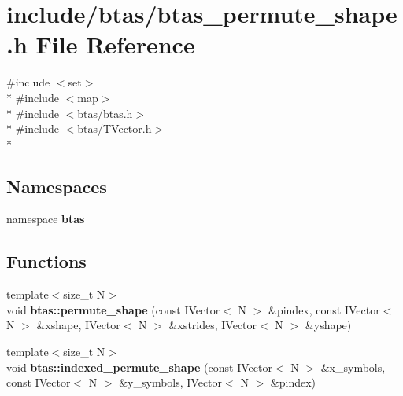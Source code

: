 \section{include/btas/btas\-\_\-permute\-\_\-shape.h File Reference}
\label{dc/d2e/btas__permute__shape_8h}
{\ttfamily \#include $<$set$>$}\\*
{\ttfamily \#include $<$map$>$}\\*
{\ttfamily \#include $<$btas/btas.\-h$>$}\\*
{\ttfamily \#include $<$btas/\-T\-Vector.\-h$>$}\\*
\subsection*{Namespaces}
\begin{DoxyCompactItemize}
\item 
namespace {\bf btas}
\end{DoxyCompactItemize}
\subsection*{Functions}
\begin{DoxyCompactItemize}
\item 
{\footnotesize template$<$size\-\_\-t N$>$ }\\void {\bf btas\-::permute\-\_\-shape} (const I\-Vector$<$ N $>$ \&pindex, const I\-Vector$<$ N $>$ \&xshape, I\-Vector$<$ N $>$ \&xstrides, I\-Vector$<$ N $>$ \&yshape)
\item 
{\footnotesize template$<$size\-\_\-t N$>$ }\\void {\bf btas\-::indexed\-\_\-permute\-\_\-shape} (const I\-Vector$<$ N $>$ \&x\-\_\-symbols, const I\-Vector$<$ N $>$ \&y\-\_\-symbols, I\-Vector$<$ N $>$ \&pindex)
\end{DoxyCompactItemize}
